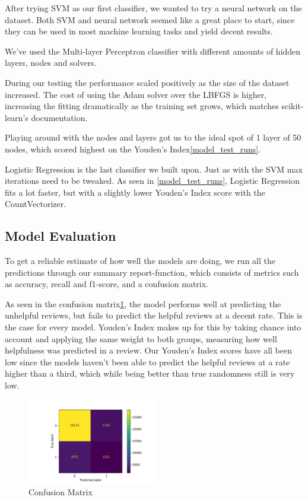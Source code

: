\documentclass[twoside,twocolumn]{article}
\begin{document}
After trying SVM as our first classifier, we wanted to try a neural network on the dataset. Both SVM and neural network seemed like a great place to start, since they can be used in most machine learning tasks and yield decent results.

We've used the Multi-layer Perceptron classifier with different amounts of hidden layers, nodes and solvers.

During our testing the performance scaled positively as the size of the dataset increased. The cost of using the Adam solver over the LBFGS is higher, increasing the fitting dramatically as the training set grows, which matches scikit-learn's documentation\cite{sklearn:MLPClassifier}.

Playing around with the nodes and layers got us to the ideal spot of 1 layer of 50 nodes, which scored highest on the Youden's Index\ref{model_test_runs}.

Logistic Regression is the last classifier we built upon\cite{sklearn:LogisticRegression}. Just as with the SVM max iterations need to be tweaked. As seen in \figurename{\ref{model_test_runs}}, Logistic Regression fits a lot faster, but with a slightly lower Youden’s Index score with the CountVectorizer.

\subsection{Model Evaluation}
To get a reliable estimate of how well the models are doing, we run all the predictions through our summary report-function, which consists of metrics such as accuracy, recall and f1-score, and a confusion matrix.

As seen in the confusion matrix\ref{fig:confusion_matrix}, the model performs well at predicting the unhelpful reviews, but fails to predict the helpful reviews at a decent rate. This is the case for every model. Youden's Index makes up for this by taking chance into account and applying the same weight to both groups, measuring how well helpfulness was predicted in a review. Our Youden's Index scores have all been low since the models haven't been able to predict the helpful reviews at a rate higher than a third, which while being better than true randomness still is very low.

\begin{figure}[h]
	\centering
	\includegraphics[width=0.5\textwidth]{img/tm_mlp_lbgfs_confusion_matrix.pdf}
	\caption{Confusion Matrix}
	\label{fig:confusion_matrix}
\end{figure}
\end{document}
